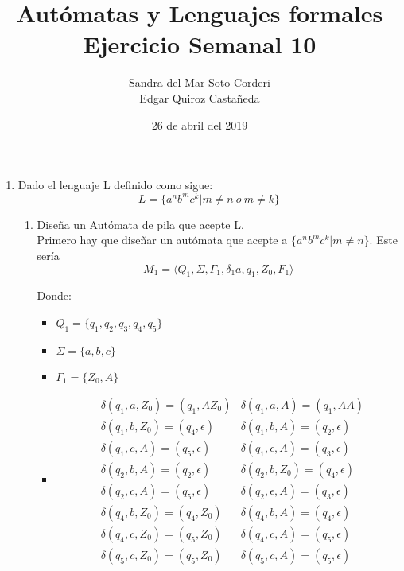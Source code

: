 \documentclass{article}
\begin{document}
    \title{
        Autómatas y Lenguajes formales \\
        Ejercicio Semanal 10
    }

    \author{
        Sandra del Mar Soto Corderi \\
        Edgar Quiroz Castañeda
    }

    \date{
        26 de abril del 2019
    }
    
    \maketitle

    \begin{enumerate}
        \item {
        Dado el lenguaje L definido como sigue:\\
        \begin{equation*}
        	L = \{a^nb^mc^k | m \neq n \ o \   m \neq k \}
        \end{equation*}
        
        
        \begin{enumerate}
        	\item {
        	Diseña un Autómata de pila que acepte L.\\
         	Primero hay que diseñar un autómata que acepte a $\{a^nb^mc^k | m \neq n \}$.
         	Este sería 
         	\[M_1 = \langle Q_1 , \Sigma, \Gamma_1 , \delta_1a, q_1 , Z_0,  F_1\rangle\]
         
	         Donde:
	         
	         \begin{itemize}
	         	\item {
	         		$Q_1 = \{q_1, q_2, q_3, q_4, q_5\}$
	         	}
	         	\item {
	         		$\Sigma = \{a, b,c\}$
	         	}
	         	\item {
	         		$\Gamma_1 = \{Z_0, A\}$
	         	}
	         	        					 
				\item {     		
					\begin{align*}
						&\delta (q_1, a, Z_0) = (q_1, AZ_0)
						&\delta (q_1, a, A) = (q_1, AA) \\
						&\delta (q_1, b, Z_0) = (q_4, \epsilon)
						&\delta (q_1, b, A) = (q_2, \epsilon) \\
						&\delta (q_1, c, A) = (q_5, \epsilon)
						&\delta (q_1, \epsilon, A) = (q_3, \epsilon) \\
						&\delta (q_2, b, A) = (q_2, \epsilon)
						&\delta (q_2, b, Z_0) = (q_4, \epsilon) \\
						&\delta (q_2, c, A) = (q_5, \epsilon)
						&\delta (q_2, \epsilon, A) = (q_3, \epsilon) \\
						&\delta (q_4, b, Z_0) = (q_4, Z_0)
						&\delta (q_4, b, A) = (q_4, \epsilon) \\
						&\delta (q_4, c, Z_0) = (q_5, Z_0)
						&\delta (q_4, c, A) = (q_5, \epsilon) \\
						&\delta (q_5, c, Z_0) = (q_5, Z_0)
						&\delta (q_5, c, A) = (q_5, \epsilon)
	         		\end{align*}
				}
				 

\end{itemize}}
\end{enumerate}}
\end{enumerate}
\end{document}
